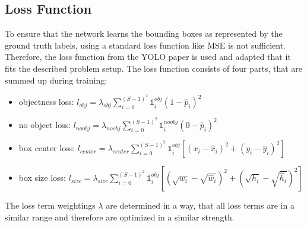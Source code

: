 \documentclass[landscape,a2,final,12pt]{issposter}
\begin{document}
\begin{multicols}{3}
\begin{samepage}
    \section{Loss Function}
            \begin{small} To ensure that the network learns the bounding boxes as represented by the ground truth labels, 
            using a standard loss function like MSE is not sufficient. Therefore, the loss function from the YOLO paper is used and adapted 
            that it fits the described problem setup. The loss function consists of four parts, that are summed up during training:
            \begin{itemize}
                \item objectness loss: \quad $l_{obj} = \lambda_{obj} \sum_{i=0}^{(S-1)^2} \mathds{1}_{i}^{obj} (1 - \hat{p}_i)^2  $
                \item no object loss: \; \quad $l_{noobj} = \lambda_{noobj} \sum_{i=0}^{(S-1)^2} \mathds{1}_{i}^{noobj} (0 - \hat{p}_i)^2  $
                \item box center loss: \enspace $l_{center} = \lambda_{center} \sum_{i=0}^{(S-1)^2} \mathds{1}_{i}^{obj} [(x_i - \hat{x}_i)^2 + (y_i - \hat{y}_i)^2] $
                \item box size loss: \quad \enspace $l_{size} = \lambda_{size} \sum_{i=0}^{(S-1)^2} \mathds{1}_{i}^{obj} [(\sqrt{w_i} - \sqrt{\hat{w}_i})^2 + (\sqrt{h_i} - \sqrt{\hat{h}_i})^2] $
            \end{itemize}

            The loss term weightings $\lambda$ are determined in a way, that all loss terms are in a 
            similar range and therefore are optimized in a similar strength.


\end{small}
\end{samepage}
\end{multicols}
\end{document}
